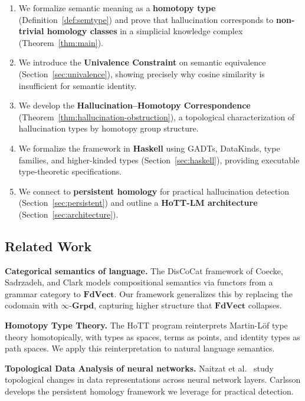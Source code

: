 \documentclass[11pt,a4paper,twocolumn]{article}
\theoremstyle{plain}
\theoremstyle{definition}
\newcommand{\Grpd}{\boldsymbol{\infty}\text{-}\mathbf{Grpd}}
\begin{document}
\begin{enumerate}[leftmargin=*,nosep]
  \item We formalize semantic meaning as a \textbf{homotopy type} (Definition~\ref{def:semtype}) and prove that hallucination corresponds to \textbf{non-trivial homology classes} in a simplicial knowledge complex (Theorem~\ref{thm:main}).
  \item We introduce the \textbf{Univalence Constraint} on semantic equivalence (Section~\ref{sec:univalence}), showing precisely why cosine similarity is insufficient for semantic identity.
  \item We develop the \textbf{Hallucination--Homotopy Correspondence} (Theorem~\ref{thm:hallucination-obstruction}), a topological characterization of hallucination types by homotopy group structure.
  \item We formalize the framework in \textbf{Haskell} using GADTs, DataKinds, type families, and higher-kinded types (Section~\ref{sec:haskell}), providing executable type-theoretic specifications.
  \item We connect to \textbf{persistent homology} for practical hallucination detection (Section~\ref{sec:persistent}) and outline a \textbf{HoTT-LM architecture} (Section~\ref{sec:architecture}).
\end{enumerate}

\subsection{Related Work}

\textbf{Categorical semantics of language.} The DisCoCat framework of Coecke, Sadrzadeh, and Clark \cite{coecke2010mathematical} models compositional semantics via functors from a grammar category to $\mathbf{FdVect}$. Our framework generalizes this by replacing the codomain with $\Grpd$, capturing higher structure that $\mathbf{FdVect}$ collapses.

\textbf{Homotopy Type Theory.} The HoTT program \cite{hottbook} reinterprets Martin-L\"of type theory homotopically, with types as spaces, terms as points, and identity types as path spaces. We apply this reinterpretation to natural language semantics.

\textbf{Topological Data Analysis of neural networks.} Naitzat et al.\ \cite{naitzat2020topology} study topological changes in data representations across neural network layers. Carlsson \cite{carlsson2009topology} develops the persistent homology framework we leverage for practical detection.
\end{document}
